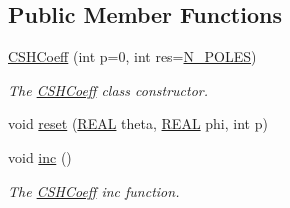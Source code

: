 \subsection*{Public Member Functions}
\begin{DoxyCompactItemize}
\item 
\hyperlink{classCSHCoeff_a286a374e16fd7741f869fe5edb1ef9d4}{C\-S\-H\-Coeff} (int p=0, int res=\hyperlink{mcoeff_8h_ac23f9c13c5d07d9ce386f7a830c35e5a}{N\-\_\-\-P\-O\-L\-E\-S})
\begin{DoxyCompactList}\small\item\em The \hyperlink{classCSHCoeff}{C\-S\-H\-Coeff} class constructor. \end{DoxyCompactList}\item 
void \hyperlink{classCSHCoeff_a7aa1d16fe8a3e18012f2ccaec89a0a0f}{reset} (\hyperlink{util_8h_a5821460e95a0800cf9f24c38915cbbde}{R\-E\-A\-L} theta, \hyperlink{util_8h_a5821460e95a0800cf9f24c38915cbbde}{R\-E\-A\-L} phi, int p)
\item 
void \hyperlink{classCSHCoeff_adf80cf8370b4db9957de7acfe8aa64d6}{inc} ()
\begin{DoxyCompactList}\small\item\em The \hyperlink{classCSHCoeff}{C\-S\-H\-Coeff} inc function. \end{DoxyCompactList}\end{DoxyCompactItemize}
